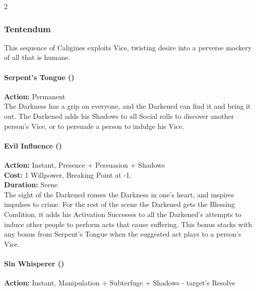 \begin{multicols}{2}
\subsubsection*{Tentendum}

This sequence of Caligines exploits Vice, twisting desire into a perverse mockery of all that is humane. \\

\paragraph*{Serpent's Tongue (\textbullet)} 

\noindent \textbf{Action:} Permanent\\

\noindent The Darkness has a grip on everyone, and the Darkened can find it and bring it out. The Darkened adds his Shadows to all Social rolls to discover another person's Vice, or to persuade a person to indulge his Vice.\\

\paragraph*{Evil Influence (\textbullet\textbullet)}

\noindent \textbf{Action:} Instant, Presence + Persuasion + Shadows\\

\noindent \textbf{Cost:} 1 Willpower, Breaking Point at -1.\\

\noindent \textbf{Duration:} Scene \\

\noindent The sight of the Darkened rouses the Darkness in one's heart, and inspires impulses to crime. For the rest of the scene the Darkened gets the Blessing Condition, it adds his Activation Successes to all the Darkened's attempts to induce other people to perform acts that cause suffering. This bonus stacks with any bonus from Serpent's Tongue when the suggested act plays to a person's Vice.\\

\paragraph*{Sin Whisperer (\textbullet\textbullet\textbullet)}

\noindent \textbf{Action:} Instant, Manipulation + Subterfuge + Shadows - target's Resolve \\


\end{multicols}

